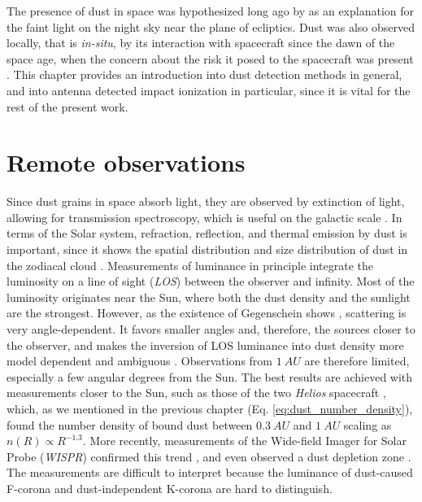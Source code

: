 The presence of dust in space was hypothesized long ago by \citet{cassini1685} as an explanation for the faint light on the night sky near the plane of ecliptics. Dust was also observed locally, that is \textit{in-situ}, by its interaction with spacecraft since the dawn of the space age, when the concern about the risk it posed to the spacecraft was present \citep{whipple1958meteoritic}. This chapter provides an introduction into dust detection methods in general, and into antenna detected impact ionization in particular, since it is vital for the rest of the present work.

\section{Remote observations}

Since dust grains in space absorb light, they are observed by extinction of light, \citep{desert1990interstellar} allowing for transmission spectroscopy, which is useful on the galactic scale \citep{mann2010interstellar}. In terms of the Solar system, refraction, reflection, and thermal emission by dust is important, since it shows the spatial distribution and size distribution of dust in the zodiacal cloud \citep{allen1946spectrum,hulst1947zodiacal,leinert1981zodiacal,stenborg2018characterization,stenborg2021psp}. Measurements of luminance in principle integrate the luminosity on a line of sight (\textit{LOS}) between the observer and infinity. Most of the luminosity originates near the Sun, where both the dust density and the sunlight are the strongest. However, as the existence of Gegenschein shows \citep{roosen1971gegenschein}, scattering is very angle-dependent. It favors smaller angles and, therefore, the sources closer to the observer, and makes the inversion of LOS luminance into dust density more model dependent and ambiguous \citep{mann2004dust,kneissel1991spatial}. Observations from $\SI{1}{AU}$ are therefore limited, especially a few angular degrees from the Sun. The best results are achieved with measurements closer to the Sun, such as those of the two \textit{Helios} spacecraft \cite{leinert1981zodiacal}, which, as we mentioned in the previous chapter (Eq. \ref{eq:dust_number_density}), found the number density of bound dust between $\SI{0.3}{AU}$ and $\SI{1}{AU}$ scaling as $n(R) \propto R^{-1.3}$. More recently, measurements of the Wide-field Imager for Solar Probe (\textit{WISPR}) confirmed this trend \citep{stenborg2021psp}, and even observed a dust depletion zone \citep{stenborg2022psp}. The measurements are difficult to interpret because the luminance of dust-caused F-corona and dust-independent K-corona are hard to distinguish. 

